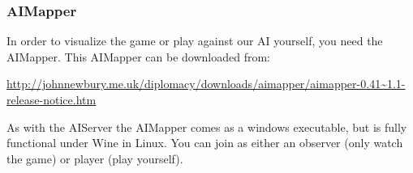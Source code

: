 \documentclass[a4paper]{article} %
\begin{document}
\subsubsection{AIMapper}
In order to visualize the game or play against our AI yourself, you need the AIMapper. This AIMapper can be downloaded from: 

\begin{sloppypar}
\noindent\url{http://johnnewbury.me.uk/diplomacy/downloads/aimapper/aimapper-0.41~1.1-release-notice.htm}
\end{sloppypar}

As with the AIServer the AIMapper comes as a windows executable, but is fully functional under Wine in Linux. You can join as either an observer (only watch the game) or player (play yourself). 









{}
\end{document}
